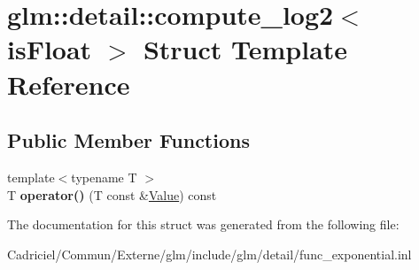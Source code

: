 \hypertarget{structglm_1_1detail_1_1compute__log2}{}\section{glm\+:\+:detail\+:\+:compute\+\_\+log2$<$ is\+Float $>$ Struct Template Reference}
\label{structglm_1_1detail_1_1compute__log2}
\subsection*{Public Member Functions}
\begin{DoxyCompactItemize}
\item 
{\footnotesize template$<$typename T $>$ }\\T {\bfseries operator()} (T const \&\hyperlink{document_8h_a071cf97155ba72ac9a1fc4ad7e63d481}{Value}) const \hypertarget{structglm_1_1detail_1_1compute__log2_a89ee0d494b7df86090055438a30bff32}{}\label{structglm_1_1detail_1_1compute__log2_a89ee0d494b7df86090055438a30bff32}

\end{DoxyCompactItemize}


The documentation for this struct was generated from the following file\+:\begin{DoxyCompactItemize}
\item 
Cadriciel/\+Commun/\+Externe/glm/include/glm/detail/func\+\_\+exponential.\+inl\end{DoxyCompactItemize}
